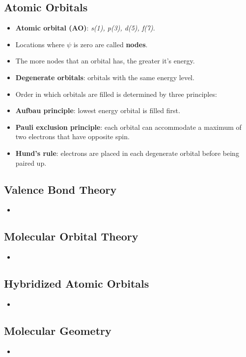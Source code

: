 \documentclass[12pt,a4paper]{article}
\begin{document}
\subsection{Atomic Orbitals}
\begin{itemize}
    \item \textbf{Atomic orbital (AO)}: \textit{s(1), p(3), d(5), f(7)}. 
    \item Locations where $\psi$ is zero are called \textbf{nodes}.
    \item The more nodes that an orbital has, the greater it's energy.
    \item \textbf{Degenerate orbitals}: orbitals with the same energy level.
    \item Order in which orbitals are filled is determined by three principles:
        \item \textbf{Aufbau principle}: lowest energy orbital is filled first.
        \item \textbf{Pauli exclusion principle}: each orbital can accommodate a maximum of two electrons that have opposite spin.
        \item \textbf{Hund's rule}: electrons are placed in each degenerate orbital before being paired up.
\end{itemize}

\subsection{Valence Bond Theory}
\begin{itemize}
    \item 
\end{itemize}

\subsection{Molecular Orbital Theory}
\begin{itemize}
    \item 
\end{itemize}

\subsection{Hybridized Atomic Orbitals}
\begin{itemize}
    \item 
\end{itemize}

\subsection{Molecular Geometry}
\begin{itemize}
    \item 
\end{itemize}
\end{document}
